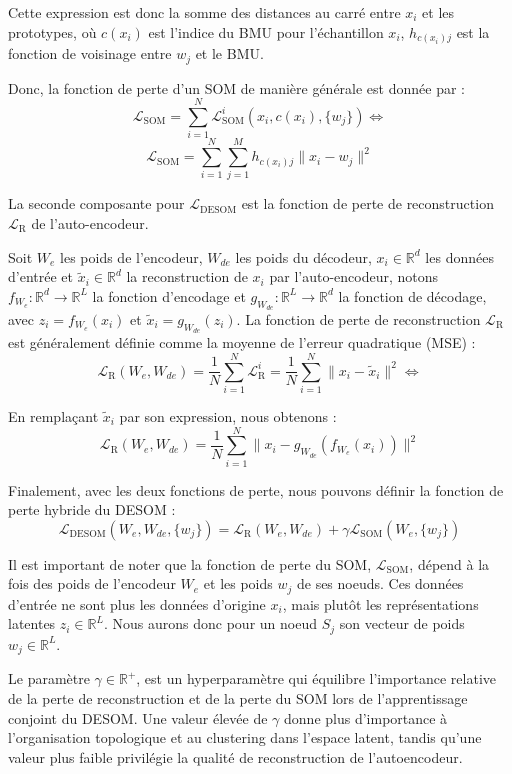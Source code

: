\documentclass[12pt,a4paper]{report}
\begin{document}
Cette expression est donc la somme des distances au carré entre $x_i$ et les prototypes, où $c(x_i)$ est l'indice du BMU pour l'échantillon $x_i$, 
$h_{c(x_i) j}$ est la fonction de voisinage entre $w_j$ et le BMU.

Donc, la fonction de perte d'un SOM de manière générale est donnée par :
$$ \mathcal{L}_{\text{SOM}} = \sum_{i=1}^{N} \mathcal{L}_{\text{SOM}}^i(x_i, c(x_i), \{w_j\}) \Leftrightarrow $$
$$ \mathcal{L}_{\text{SOM}} = \sum_{i=1}^{N} \sum_{j=1}^{M} h_{c(x_i) j} \| x_i - w_j \|^2 $$

La seconde composante pour $ \mathcal{L}_{\text{DESOM}} $ est la fonction de perte de reconstruction $\mathcal{L}_{\text{R}}$ de l'auto-encodeur.

Soit $W_e$ les poids de l'encodeur, $W_{de}$ les poids du décodeur, $x_i \in \mathbb{R}^d$ les données d'entrée et $\tilde{x}_i \in \mathbb{R}^d$ la reconstruction de $x_i$ par l'auto-encodeur, notons
$f_{W_e}: \mathbb{R}^d \to \mathbb{R}^L$ la fonction d'encodage et $g_{W_{de}}: \mathbb{R}^L \to \mathbb{R}^d$ la fonction de décodage, avec $z_i = f_{W_e}(x_i)$ et $\tilde{x}_i = g_{W_{de}}(z_i)$.
La fonction de perte de reconstruction $\mathcal{L}_{\text{R}}$ est généralement définie comme la moyenne de l'erreur quadratique (MSE) \cite{DESOM}:
$$ \mathcal{L}_{\text{R}}(W_e, W_{de}) = \frac{1}{N} \sum_{i=1}^{N} \mathcal{L}_{\text{R}}^i =\frac{1}{N} \sum_{i=1}^{N} \| x_i - \tilde{x}_i \|^2 \Leftrightarrow$$

En remplaçant $\tilde{x}_i$ par son expression, nous obtenons :
$$ \mathcal{L}_{\text{R}}(W_e, W_{de}) = \frac{1}{N} \sum_{i=1}^{N} \| x_i - g_{W_{de}}(f_{W_e}(x_i)) \|^2 $$

Finalement, avec les deux fonctions de perte, nous pouvons définir la fonction de perte hybride du DESOM \cite{DESOM}:
$$ \mathcal{L}_{\text{DESOM}}(W_e, W_{de}, \{w_j\}) = \mathcal{L}_{\text{R}}(W_e, W_{de}) + \gamma  \mathcal{L}_{\text{SOM}}(W_e, \{w_j\}) $$

Il est important de noter que la fonction de perte du SOM, $\mathcal{L}_{\text{SOM}}$, dépend à la fois des poids de l'encodeur $W_e$ et les poids $w_j$ de ses noeuds.
Ces données d'entrée ne sont plus les données d'origine $x_i$, mais plutôt les représentations latentes $z_i \in \mathbb{R}^L$. Nous aurons donc pour un noeud $S_j$ 
son vecteur de poids $w_j \in \mathbb{R}^L$.

Le paramètre $\gamma \in \mathbb{R}^+$, est un hyperparamètre qui équilibre l'importance relative de la perte de reconstruction et de la perte du SOM lors de l'apprentissage conjoint du DESOM.
Une valeur élevée de $\gamma$ donne plus d'importance à l'organisation topologique et au clustering dans l'espace latent, 
tandis qu'une valeur plus faible privilégie la qualité de reconstruction de l'autoencodeur. 
\end{document}

